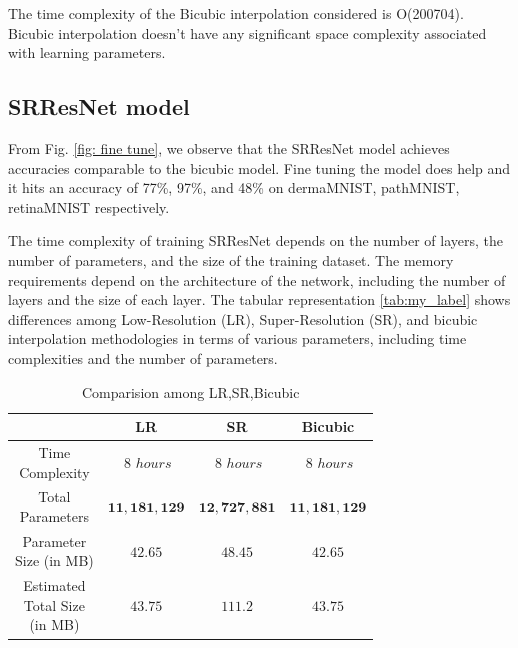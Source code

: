 \documentclass[10pt,twocolumn,letterpaper]{article}
\begin{document}
The time complexity of the Bicubic interpolation considered is O(200704). Bicubic interpolation doesn't have any significant space complexity associated with learning parameters.

\subsection{SRResNet model}
From Fig. \ref{fig: fine tune}, we observe that the SRResNet model achieves accuracies comparable to the bicubic model. Fine tuning the model does help and it hits an accuracy of 77\%, 97\%, and 48\% on dermaMNIST, pathMNIST, retinaMNIST respectively.

The time complexity of training SRResNet depends on the number of layers, the number of parameters, and the size of the training dataset. The memory requirements depend on the architecture of the network, including the number of layers and the size of each layer.
The tabular representation \ref{tab:my_label} shows differences among Low-Resolution (LR), Super-Resolution (SR), and bicubic interpolation methodologies in terms of various parameters, including time complexities and the number of parameters.

\begin{table} 
    \begin{center}
    \begin{tabular}{|| c | c | c | c ||}
        \hline
                 & LR & SR &Bicubic\\
        \hline\hline
        \makecell{Time\\ Complexity} & $~8$ $hours$  & $~8$ $hours$ & $~8$ $hours$ \\
        \hline
        \makecell{Total\\ Parameters} &  $\mathbf{11,181,129} $ & $\mathbf{12,727,881}$ & $\mathbf{11,181,129}$\\
        \hline
         \makecell{Parameter \\ Size (in MB)} &  $\mathbf{42.65} $ & $\mathbf{48.45}$&  $\mathbf{42.65} $  \\
         \hline
        \makecell{Estimated \\ Total Size \\ (in MB)} &  $\mathbf{43.75} $ & $\mathbf{111.2}$ &  $\mathbf{43.75} $  \\
        \hline \hline
    \end{tabular}
    
    \caption{Comparision among LR,SR,Bicubic}
    \label{tab:table 2}
    \end{center}
\end{table}
\end{document}
